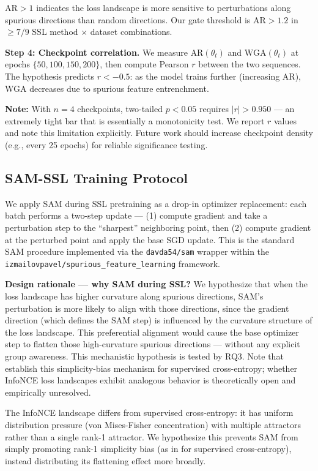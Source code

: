 $\text{AR} > 1$ indicates the loss landscape is more sensitive to perturbations along spurious directions than random directions. Our gate threshold is $\text{AR} > 1.2$ in $\geq 7/9$ SSL method $\times$ dataset combinations.

\textbf{Step 4: Checkpoint correlation.}
We measure $\text{AR}(\theta_t)$ and $\text{WGA}(\theta_t)$ at epochs $\{50, 100, 150, 200\}$, then compute Pearson $r$ between the two sequences. The hypothesis predicts $r < -0.5$: as the model trains further (increasing AR), WGA decreases due to spurious feature entrenchment.

\textbf{Note:} With $n=4$ checkpoints, two-tailed $p<0.05$ requires $|r|>0.950$ --- an extremely tight bar that is essentially a monotonicity test. We report $r$ values and note this limitation explicitly. Future work should increase checkpoint density (e.g., every 25 epochs) for reliable significance testing.

\subsection{SAM-SSL Training Protocol}

We apply SAM during SSL pretraining as a drop-in optimizer replacement: each batch performs a two-step update --- (1) compute gradient and take a perturbation step to the ``sharpest'' neighboring point, then (2) compute gradient at the perturbed point and apply the base SGD update. This is the standard SAM procedure implemented via the \texttt{davda54/sam} wrapper \citep{davda54sam2021} within the \texttt{izmailovpavel/spurious\_feature\_learning} framework.

\textbf{Design rationale --- why SAM during SSL?} We hypothesize that when the loss landscape has higher curvature along spurious directions, SAM's perturbation is more likely to align with those directions, since the gradient direction (which defines the SAM step) is influenced by the curvature structure of the loss landscape. This preferential alignment would cause the base optimizer step to flatten those high-curvature spurious directions --- without any explicit group awareness. This mechanistic hypothesis is tested by RQ3. Note that \citet{gatmiry2024sam} establish this simplicity-bias mechanism for supervised cross-entropy; whether InfoNCE loss landscapes exhibit analogous behavior is theoretically open and empirically unresolved.

The InfoNCE landscape differs from supervised cross-entropy: it has uniform distribution pressure (von Mises-Fisher concentration) with multiple attractors rather than a single rank-1 attractor. We hypothesize this prevents SAM from simply promoting rank-1 simplicity bias (as in \citet{gatmiry2024sam} for supervised cross-entropy), instead distributing its flattening effect more broadly.

